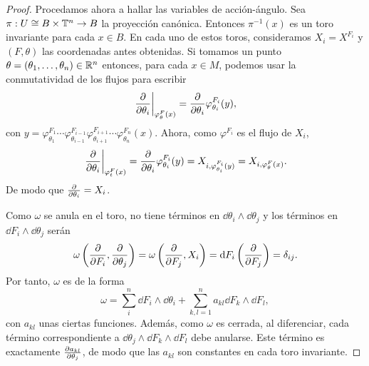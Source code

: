 \begin{proof}
 Procedamos ahora a hallar las variables de acción-ángulo. Sea $\pi:U\cong B\times \mathbb{T}^n\rightarrow B$ la proyección canónica. Entonces $\pi^{-1}(x)$ es un toro invariante para cada $x \in B$. En cada uno de estos toros, consideramos $X_i=X^{F_i}$ y $(F,\theta)$ las coordenadas antes obtenidas. Si tomamos un punto $\theta=(\theta_1,\dots,\theta_n)\in \mathbb{R}^n$ entonces, para cada $x\in M$, podemos usar la conmutatividad de los flujos para escribir
\[
  \left. \frac{\partial}{\partial \theta_i}\right|_{\varphi^F_{\theta}(x)} = \frac{\partial}{\partial \theta_i} \varphi^{F_i}_{\theta_i}(y),
\]
con $y=\varphi^{F_1}_{\theta_1}\cdots\varphi^{F_{i-1}}_{\theta_{i-1}}\varphi^{F_{i+1}}_{\theta_{i+1}}\cdots\varphi^{F_{n}}_{\theta_{n}}(x)$. Ahora, como $\varphi^{F_i}$ es el flujo de $X_i$,
\begin{equation*}
  \left. \frac{\partial}{\partial \theta_i}\right|_{\varphi^F_t(x)} = \frac{\partial}{\partial \theta_i} \varphi^{F_i}_{\theta_i}(y)=X_{i, \varphi^{F_i}_{\theta_i}(y)}=X_{i,\varphi^F_{\theta}(x)}.
\end{equation*}
De modo que $\frac{\partial}{\partial \theta_i}=X_i$.

Como $\omega$ se anula en el toro, no tiene términos en $\dd \theta_i \wedge \dd \theta_j$ y los términos en $\dd F_i \wedge \dd \theta_j$ serán
\[
  \omega\left(\frac{\partial}{\partial F_i},\frac{\partial}{\partial \theta_j}\right)=\omega\left(\frac{\partial}{\partial F_j},X_i\right)=\mathrm{d} F_i\left(\frac{\partial}{\partial F_j}\right)=\delta_{ij}.
\]
Por tanto, $\omega$ es de la forma
\[
  \omega = \sum_{i}^n  \dd F_i \wedge \dd \theta_i + \sum_{k,l=1}^n a_{kl} \dd F_k \wedge \dd F_l,
\]
con $a_{kl}$ unas ciertas funciones. Además, como $\omega$ es cerrada, al diferenciar, cada término correspondiente a $\dd \theta_j \wedge \dd F_k \wedge \dd F_l$ debe anularse. Este término es exactamente
  $\frac{\partial a_{kl}}{\partial \theta_j}$,
de modo que las $a_{kl}$ son constantes en cada toro invariante.


\end{proof}
